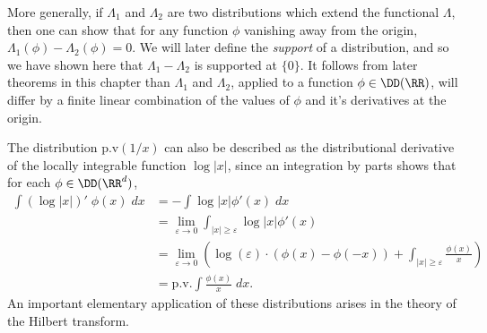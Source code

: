 \begin{example}
    More generally, if $\Lambda_1$ and $\Lambda_2$ are two distributions which extend the functional $\Lambda$, then one can show that for any function $\phi$ vanishing away from the origin, $\Lambda_1(\phi) - \Lambda_2(\phi) = 0$. We will later define the \emph{support} of a distribution, and so we have shown here that $\Lambda_1 - \Lambda_2$ is supported at $\{ 0 \}$. It follows from later theorems in this chapter than $\Lambda_1$ and $\Lambda_2$, applied to a function $\phi \in \DD(\RR)$, will differ by a finite linear combination of the values of $\phi$ and it's derivatives at the origin.

    The distribution $\text{p.v}(1/x)$ can also be described as the distributional derivative of the locally integrable function $\log |x|$, since an integration by parts shows that for each $\phi \in \DD(\RR^d)$,
    \begin{align*}
        \int (\log |x|)'\; \phi(x)\; dx &= - \int \log |x| \phi'(x)\; dx\\
        &= \lim_{\varepsilon \to 0} \int_{|x| \geq \varepsilon} \log |x| \phi'(x)\\
        &= \lim_{\varepsilon \to 0} \left( \log(\varepsilon) \cdot \left( \phi(x) - \phi(-x) \right) + \int_{|x| \geq \varepsilon} \frac{\phi(x)}{x} \right)\\
        &= \text{p.v.} \int \frac{\phi(x)}{x}\; dx.
    \end{align*}
    An important elementary application of these distributions arises in the theory of the Hilbert transform.
\end{example}

